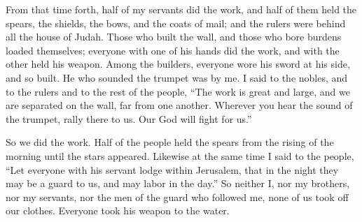 {From that time forth, half of my servants did the work, and half of them held the spears, the shields, the bows, and the coats of mail; and the rulers were behind all the house of Judah.
Those who built the wall, and those who bore burdens loaded themselves; everyone with one of his hands did the work, and with the other held his weapon.
Among the builders, everyone wore his sword at his side, and so built. He who sounded the trumpet was by me.
I said to the nobles, and to the rulers and to the rest of the people, “The work is great and large, and we are separated on the wall, far from one another.
Wherever you hear the sound of the trumpet, rally there to us. Our God will fight for us.”
\par }{\PP {}So we did the work. Half of the people held the spears from the rising of the morning until the stars appeared.
Likewise at the same time I said to the people, “Let everyone with his servant lodge within Jerusalem, that in the night they may be a guard to us, and may labor in the day.”
So neither I, nor my brothers, nor my servants, nor the men of the guard who followed me, none of us took off our clothes. Everyone took his weapon to the water.

}
